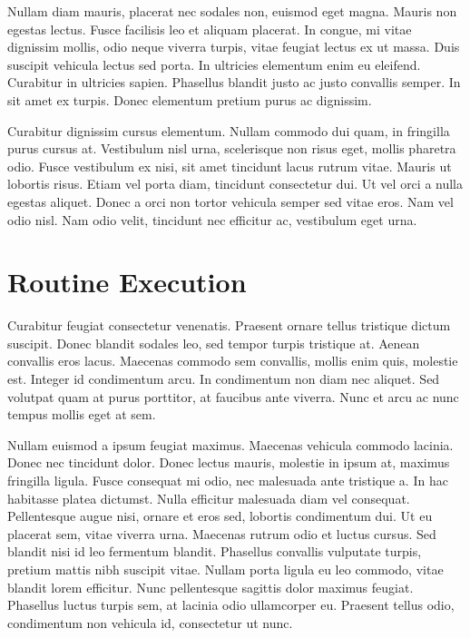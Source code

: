 Nullam diam mauris, placerat nec sodales non, euismod eget magna. Mauris non egestas lectus. Fusce facilisis leo et aliquam placerat. In congue, mi vitae dignissim mollis, odio neque viverra turpis, vitae feugiat lectus ex ut massa. Duis suscipit vehicula lectus sed porta. In ultricies elementum enim eu eleifend. Curabitur in ultricies sapien. Phasellus blandit justo ac justo convallis semper. In sit amet ex turpis. Donec elementum pretium purus ac dignissim.

Curabitur dignissim cursus elementum. Nullam commodo dui quam, in fringilla purus cursus at. Vestibulum nisl urna, scelerisque non risus eget, mollis pharetra odio. Fusce vestibulum ex nisi, sit amet tincidunt lacus rutrum vitae. Mauris ut lobortis risus. Etiam vel porta diam, tincidunt consectetur dui. Ut vel orci a nulla egestas aliquet. Donec a orci non tortor vehicula semper sed vitae eros. Nam vel odio nisl. Nam odio velit, tincidunt nec efficitur ac, vestibulum eget urna.


\section{Routine Execution}
Curabitur feugiat consectetur venenatis. Praesent ornare tellus tristique dictum suscipit. Donec blandit sodales leo, sed tempor turpis tristique at. Aenean convallis eros lacus. Maecenas commodo sem convallis, mollis enim quis, molestie est. Integer id condimentum arcu. In condimentum non diam nec aliquet. Sed volutpat quam at purus porttitor, at faucibus ante viverra. Nunc et arcu ac nunc tempus mollis eget at sem.

Nullam euismod a ipsum feugiat maximus. Maecenas vehicula commodo lacinia. Donec nec tincidunt dolor. Donec lectus mauris, molestie in ipsum at, maximus fringilla ligula. Fusce consequat mi odio, nec malesuada ante tristique a. In hac habitasse platea dictumst. Nulla efficitur malesuada diam vel consequat. Pellentesque augue nisi, ornare et eros sed, lobortis condimentum dui. Ut eu placerat sem, vitae viverra urna. Maecenas rutrum odio et luctus cursus. Sed blandit nisi id leo fermentum blandit. Phasellus convallis vulputate turpis, pretium mattis nibh suscipit vitae. Nullam porta ligula eu leo commodo, vitae blandit lorem efficitur. Nunc pellentesque sagittis dolor maximus feugiat. Phasellus luctus turpis sem, at lacinia odio ullamcorper eu. Praesent tellus odio, condimentum non vehicula id, consectetur ut nunc.


